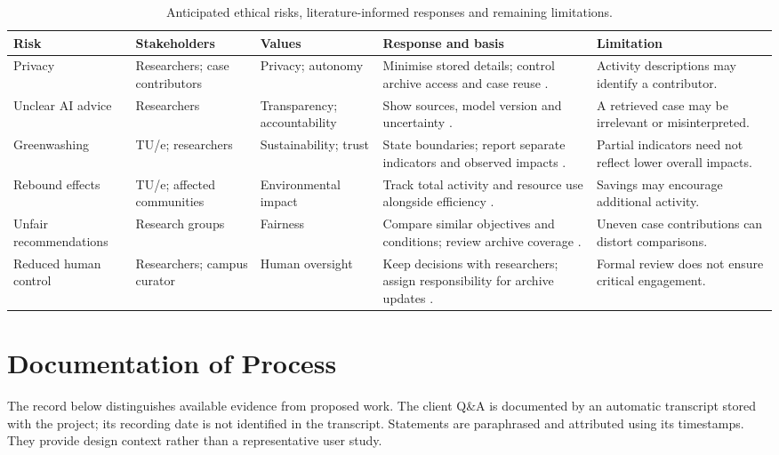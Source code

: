\documentclass[11pt,a4paper]{article}
\renewcommand{\arraystretch}{1.15}
\begin{document}
\begin{table}[!htbp]
\centering
\footnotesize
\setlength{\tabcolsep}{4pt}
\renewcommand{\arraystretch}{1.35}
\begin{tabularx}{\textwidth}{@{}>{\raggedright\arraybackslash}p{}>{\raggedright\arraybackslash}p{}>{\raggedright\arraybackslash}p{}>{\raggedright\arraybackslash}X>{\raggedright\arraybackslash}p{}@{}}
\toprule
Risk & Stakeholders & Values & Response and basis & Limitation \\
\midrule
Privacy & Researchers; case contributors & Privacy; autonomy & Minimise stored details; control archive access and case reuse \citep{hasselbalch2025sustainability}. & Activity descriptions may identify a contributor. \\
\midrule
Unclear AI advice & Researchers & Transparency; accountability & Show sources, model version and uncertainty \citep{lacoste2019carbon}. & A retrieved case may be irrelevant or misinterpreted. \\
\midrule
Greenwashing & TU/e; researchers & Sustainability; trust & State boundaries; report separate indicators and observed impacts \citep{lin2023cost}. & Partial indicators need not reflect lower overall impacts. \\
\midrule
Rebound effects & TU/e; affected communities & Environmental impact & Track total activity and resource use alongside efficiency \citep{luccioni2025rebound}. & Savings may encourage additional activity. \\
\midrule
Unfair recommendations & Research groups & Fairness & Compare similar objectives and conditions; review archive coverage \citep{hasselbalch2025sustainability}. & Uneven case contributions can distort comparisons. \\
\midrule
Reduced human control & Researchers; campus curator & Human oversight & Keep decisions with researchers; assign responsibility for archive updates \citep{santoni2018control}. & Formal review does not ensure critical engagement. \\
\bottomrule
\end{tabularx}
\caption{Anticipated ethical risks, literature-informed responses and remaining limitations.}
\label{tab:ethical-risks}
\end{table}

\clearpage
\nocite{*}



\appendix
\clearpage
\section{Documentation of Process}
\label{app:process}
The record below distinguishes available evidence from proposed work. The client Q\&A is documented by an automatic transcript stored with the project; its recording date is not identified in the transcript. Statements are paraphrased and attributed using its timestamps. They provide design context rather than a representative user study.
\end{document}
